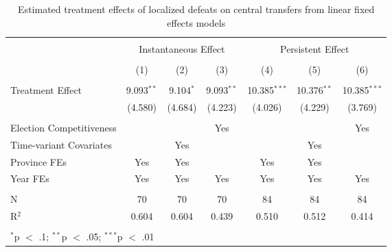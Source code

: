 
\begin{table}[!htbp] \centering 
  \caption{Estimated treatment effects of localized defeats on central transfers from linear fixed effects models} 
  \label{tab:lfe_main} 
\begin{tabular}{@{\extracolsep{5pt}}lcccccc} 
\\[-1.8ex]\hline 
\hline \\[-1.8ex] 
 & \multicolumn{3}{c}{Instantaneous Effect} & \multicolumn{3}{c}{Persistent Effect} \\ 
\\[-1.8ex] & (1) & (2) & (3) & (4) & (5) & (6)\\ 
\hline \\[-1.8ex] 
 Treatment Effect & 9.093$^{**}$ & 9.104$^{*}$ & 9.093$^{**}$ & 10.385$^{***}$ & 10.376$^{**}$ & 10.385$^{***}$ \\ 
  & (4.580) & (4.684) & (4.223) & (4.026) & (4.229) & (3.769) \\ 
 \hline \\[-1.8ex] 
Election Competitiveness &  &  & Yes &  &  & Yes \\ 
Time-variant Covariates &  & Yes &  &  & Yes &  \\ 
Province FEs & Yes & Yes &  & Yes & Yes &  \\ 
Year FEs & Yes & Yes & Yes & Yes & Yes & Yes \\ 
\hline \\[-1.8ex] 
N & 70 & 70 & 70 & 84 & 84 & 84 \\ 
R$^{2}$ & 0.604 & 0.604 & 0.439 & 0.510 & 0.512 & 0.414 \\ 
\hline 
\hline \\[-1.8ex] 
\multicolumn{7}{l}{$^{*}$p $<$ .1; $^{**}$p $<$ .05; $^{***}$p $<$ .01} \\ 
\end{tabular} 
\end{table} 
